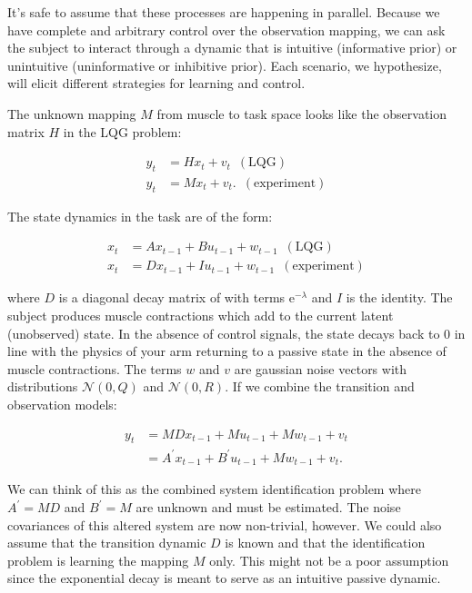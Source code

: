 \documentclass[
  a4paper,
]{article}
\begin{document}
It's safe to assume that these processes are happening in parallel.
Because we have complete and arbitrary control over the observation
mapping, we can ask the subject to interact through a dynamic that is
intuitive (informative prior) or unintuitive (uninformative or
inhibitive prior). Each scenario, we hypothesize, will elicit different
strategies for learning and control.

The unknown mapping \(M\) from muscle to task space looks like the
observation matrix \(H\) in the LQG problem:

\begin{align*}
y_t &= Hx_t + v_t\,\,\,(\mathrm{LQG}) \\
y_t &= Mx_t + v_t. \,\,\,(\mathrm{experiment})
\end{align*}

The state dynamics in the task are of the form:

\begin{align*}
x_{t} &= Ax_{t-1} + Bu_{t-1} + w_{t-1} \,\,\,(\mathrm{LQG}) \\
x_t &= Dx_{t-1} + Iu_{t-1} + w_{t-1} \,\,\,(\mathrm{experiment})
\end{align*}

where \(D\) is a diagonal decay matrix of with terms
\(\mathrm{e}^{-\lambda}\) and \(I\) is the identity. The subject
produces muscle contractions which add to the current latent
(unobserved) state. In the absence of control signals, the state decays
back to \(0\) in line with the physics of your arm returning to a
passive state in the absence of muscle contractions. The terms \(w\) and
\(v\) are gaussian noise vectors with distributions \(\mathcal{N}(0,Q)\)
and \(\mathcal{N}(0,R)\). If we combine the transition and observation
models:

\begin{align*}
y_t &= MDx_{t-1} + Mu_{t-1} + Mw_{t-1} + v_t \\
&= A^\prime x_{t-1} + B^\prime u_{t-1} + Mw_{t-1} + v_t.
\end{align*}

We can think of this as the combined system identification problem where
\(A^\prime=MD\) and \(B^\prime=M\) are unknown and must be estimated.
The noise covariances of this altered system are now non-trivial,
however. We could also assume that the transition dynamic \(D\) is known
and that the identification problem is learning the mapping \(M\) only.
This might not be a poor assumption since the exponential decay is meant
to serve as an intuitive passive dynamic.
\end{document}
